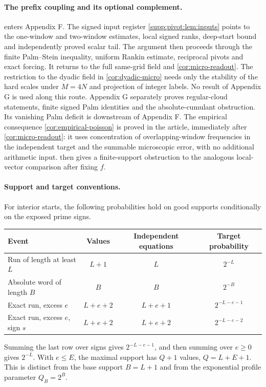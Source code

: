 \paragraph{The prefix coupling and its optional complement.}
 enters Appendix F. The signed input register
\cref{supp:pivot:lem:inputs} points to the one-window and two-window
estimates, local signed ranks, deep-start bound and independently proved
scalar tail. The argument then proceeds through the finite Palm--Stein
inequality, uniform Rankin estimate, reciprocal pivots and exact forcing.
It returns to the full same-grid field and
\cref{cor:micro-readout}. The restriction to the dyadic field in
\cref{cor:dyadic-micro} needs only the stability of the hard scales
under $M=4N$ and projection of integer labels. No result of Appendix G
is used along this route.
Appendix G separately proves regular-cloud statements, finite signed
Palm identities and the absolute-cumulant obstruction. Its vanishing
Palm deficit is downstream of Appendix F.
The empirical consequence \cref{cor:empirical-poisson} is proved in the
article, immediately after \cref{cor:micro-readout}: it uses concentration
of overlapping-window frequencies in the independent target and the
summable microscopic error, with no additional arithmetic input.
 then gives a finite-support
obstruction to the analogous local-vector comparison after fixing $f$.

\paragraph{Support and target conventions.}
For interior starts, the following probabilities hold on good supports
conditionally on the exposed prime signs.
\begin{center}\small
\begin{tabularx}{\textwidth}{@{}Xccc@{}}\toprule
Event & Values & Independent equations & Target probability\\\midrule
Run of length at least $L$ & $L+1$ & $L$ & $2^{-L}$\\
Absolute word of length $B$ & $B$ & $B$ & $2^{-B}$\\
Exact run, excess $e$ & $L+e+2$ & $L+e+1$ & $2^{-L-e-1}$\\
Exact run, excess $e$, sign $s$ & $L+e+2$ & $L+e+2$ & $2^{-L-e-2}$\\\bottomrule
\end{tabularx}
\end{center}
Summing the last row over signs gives $2^{-L-e-1}$, and then summing
over $e\ge0$ gives $2^{-L}$. With $e\le E$, the maximal support has
$Q+1$ values, $Q=L+E+1$. This is distinct from the base support
$B=L+1$ and from the exponential profile parameter $Q_B=2^B$.

